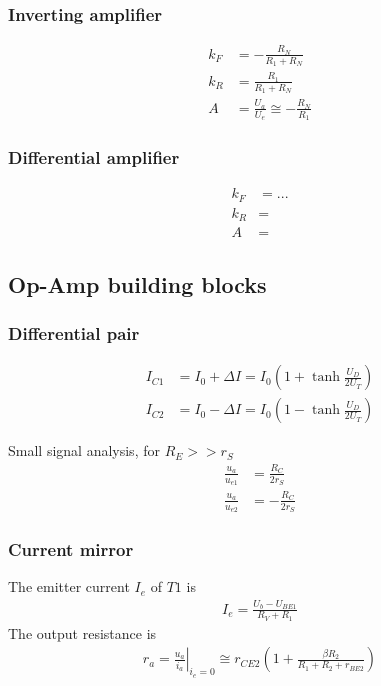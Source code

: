 \subsubsection{Inverting amplifier}
\begin{align}
	k_F &= -\frac{R_N}{R_1 + R_N} \\
	k_R &= \frac{R_1}{R_1 + R_N} \\
	A &= \frac{U_a}{U_e} \cong -\frac{R_N}{R_1}
\end{align}

\newpage
\subsubsection{Differential amplifier}
\begin{multicols}{2}
	\begin{center}
    	
	\end{center}
    \vfill\columnbreak
    \begin{align}
    	k_F &= ...\\
    	k_R &= \\
    	A &= 
    \end{align}
\end{multicols}

\subsection{Op-Amp building blocks}
\subsubsection{Differential pair}
\begin{align}
	I_{C1} &= I_0 + \Delta I = I_0 \left( 1 + \tanh\frac{U_D}{2 U_T} \right) \\
	I_{C2} &= I_0 - \Delta I = I_0 \left( 1 - \tanh\frac{U_D}{2 U_T} \right)
\end{align}

Small signal analysis, for $R_E >> r_S$
\begin{align}
	\frac{u_a}{u_{e1}} &= \frac{R_C}{2 r_S} \\
	\frac{u_a}{u_{e2}} &= -\frac{R_C}{2 r_S}
\end{align}

\subsubsection{Current mirror}
\begin{multicols}{2}
	\begin{center}
		
	\end{center}
	\vfill
	\columnbreak
	The emitter current $I_e$ of $T1$ is
	\begin{align}
		I_e = \frac{U_b - U_{BE1}}{R_V + R_1}
	\end{align}
	The output resistance is
	\begin{align}
		r_a = \left.\frac{u_a}{i_a}\right|_{i_e=0} \cong r_{CE2} \left( 1 + \frac{\beta R_2}{R_1 + R_2 + r_{BE2}} \right)
	\end{align}
\end{multicols}

